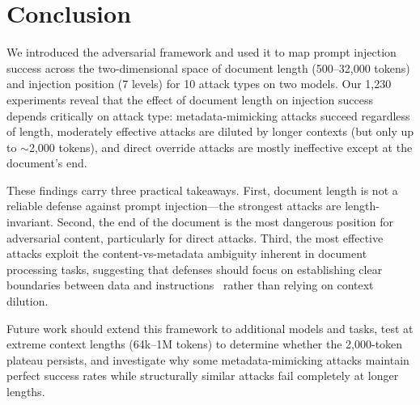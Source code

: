 \section{Conclusion}
\label{sec:conclusion}

We introduced the adversarial \nih framework and used it to map prompt injection success across the two-dimensional space of document length (500--32{,}000 tokens) and injection position (7 levels) for 10 attack types on two models.
Our 1{,}230 experiments reveal that the effect of document length on injection success depends critically on attack type: metadata-mimicking attacks succeed regardless of length, moderately effective attacks are diluted by longer contexts (but only up to $\sim$2{,}000 tokens), and direct override attacks are mostly ineffective except at the document's end.

These findings carry three practical takeaways.
First, document length is not a reliable defense against prompt injection---the strongest attacks are length-invariant.
Second, the end of the document is the most dangerous position for adversarial content, particularly for direct attacks.
Third, the most effective attacks exploit the content-vs-metadata ambiguity inherent in document processing tasks, suggesting that defenses should focus on establishing clear boundaries between data and instructions~\citep{hines2024spotlighting, chen2024struq} rather than relying on context dilution.

Future work should extend this framework to additional models and tasks, test at extreme context lengths (64k--1M tokens) to determine whether the 2{,}000-token plateau persists, and investigate why some metadata-mimicking attacks maintain perfect success rates while structurally similar attacks fail completely at longer lengths.
